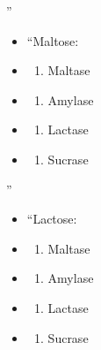 \documentclass[
]{book}
\providecommand{\tightlist}{%
  \setlength{\itemsep}{0pt}\setlength{\parskip}{0pt}}
\begin{document}
''

\begin{itemize}
\item
  ``Maltose:
\item
  \begin{enumerate}
  \def\labelenumi{(\Alph{enumi})}
  \tightlist
  \item
    Maltase\\
  \end{enumerate}
\item
  \begin{enumerate}
  \def\labelenumi{(\Alph{enumi})}
  \setcounter{enumi}{1}
  \tightlist
  \item
    Amylase\\
  \end{enumerate}
\item
  \begin{enumerate}
  \def\labelenumi{(\Alph{enumi})}
  \setcounter{enumi}{2}
  \tightlist
  \item
    Lactase\\
  \end{enumerate}
\item
  \begin{enumerate}
  \def\labelenumi{(\Alph{enumi})}
  \setcounter{enumi}{3}
  \tightlist
  \item
    Sucrase
  \end{enumerate}
\end{itemize}

''

\begin{itemize}
\item
  ``Lactose:
\item
  \begin{enumerate}
  \def\labelenumi{(\Alph{enumi})}
  \tightlist
  \item
    Maltase\\
  \end{enumerate}
\item
  \begin{enumerate}
  \def\labelenumi{(\Alph{enumi})}
  \setcounter{enumi}{1}
  \tightlist
  \item
    Amylase\\
  \end{enumerate}
\item
  \begin{enumerate}
  \def\labelenumi{(\Alph{enumi})}
  \setcounter{enumi}{2}
  \tightlist
  \item
    Lactase\\
  \end{enumerate}
\item
  \begin{enumerate}
  \def\labelenumi{(\Alph{enumi})}
  \setcounter{enumi}{3}
  \tightlist
  \item
    Sucrase
  \end{enumerate}
\end{itemize}
\end{document}
